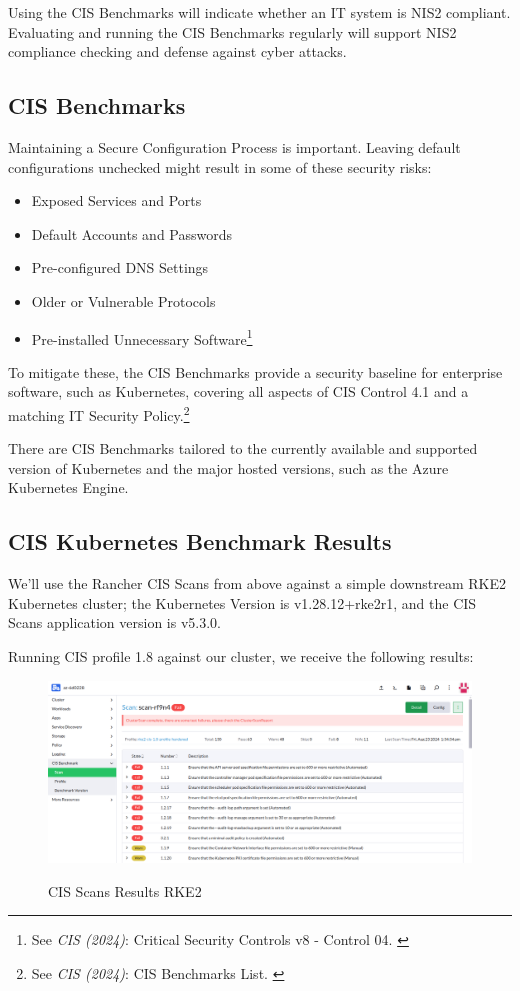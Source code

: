 Using the CIS Benchmarks will indicate whether an IT system is NIS2 compliant. Evaluating and running the CIS Benchmarks regularly will support NIS2 compliance checking and defense against cyber attacks.

\subsection{CIS Benchmarks}

Maintaining a Secure Configuration Process is important. Leaving default configurations unchecked might result in some of these security risks:

\begin{itemize}
    \item Exposed Services and Ports
    \item Default Accounts and Passwords
    \item Pre-configured DNS Settings
    \item Older or Vulnerable Protocols
    \item Pre-installed Unnecessary Software\footnote{See \textit{CIS (2024)}: Critical Security Controls v8 - Control 04. \cite{cisControls}}
\end{itemize}

To mitigate these, the CIS Benchmarks provide a security baseline for enterprise software, such as Kubernetes, covering all aspects of CIS Control 4.1 and a matching IT Security Policy.\footnote{See \textit{CIS (2024)}: CIS Benchmarks List. \cite{cisBenchmarks}}

There are CIS Benchmarks tailored to the currently available and supported version of Kubernetes and the major hosted versions, such as the Azure Kubernetes Engine.

\subsection{CIS Kubernetes Benchmark Results}

We'll use the Rancher CIS Scans from above against a simple downstream RKE2 Kubernetes cluster; the Kubernetes Version is v1.28.12+rke2r1, and the CIS Scans application version is v5.3.0.

Running CIS profile 1.8 against our cluster, we receive the following results:

\begin{figure}[H]
\centering
\caption {CIS Scans Results RKE2}
\includegraphics[width=\linewidth]{images/cis-scans-3.png}
\label{fig:cisRKE2}
\end{figure}

